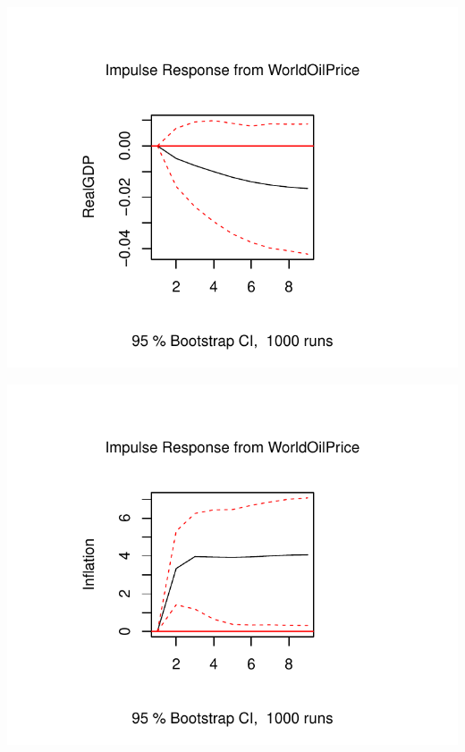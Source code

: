 \documentclass[11pt,preprint, authoryear]{elsarticle}
\numberwithin{equation}{section}
\numberwithin{figure}{section}
\numberwithin{table}{section}
\begin{document}
\begin{center}\includegraphics{README_files/figure-latex/unnamed-chunk-16-3} \end{center}

\begin{center}\includegraphics{README_files/figure-latex/unnamed-chunk-16-4} \end{center}
\end{document}
